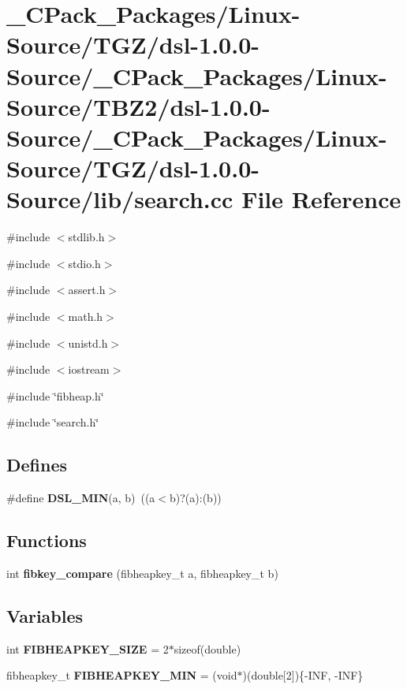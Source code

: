 \section{\_\-CPack\_\-Packages/Linux-\/Source/TGZ/dsl-\/1.0.0-\/Source/\_\-CPack\_\-Packages/Linux-\/Source/TBZ2/dsl-\/1.0.0-\/Source/\_\-CPack\_\-Packages/Linux-\/Source/TGZ/dsl-\/1.0.0-\/Source/lib/search.cc File Reference}
\label{__CPack__Packages_2Linux-Source_2TGZ_2dsl-1_80_80-Source_2__CPack__Packages_2Linux-Source_2TBZ2_3883198a2c058c7cc624e08b98887636}
{\ttfamily \#include $<$stdlib.h$>$}\par
{\ttfamily \#include $<$stdio.h$>$}\par
{\ttfamily \#include $<$assert.h$>$}\par
{\ttfamily \#include $<$math.h$>$}\par
{\ttfamily \#include $<$unistd.h$>$}\par
{\ttfamily \#include $<$iostream$>$}\par
{\ttfamily \#include \char`\"{}fibheap.h\char`\"{}}\par
{\ttfamily \#include \char`\"{}search.h\char`\"{}}\par
\subsection*{Defines}
\begin{DoxyCompactItemize}
\item 
\#define {\bf DSL\_\-MIN}(a, b)~((a$<$b)?(a):(b))
\end{DoxyCompactItemize}
\subsection*{Functions}
\begin{DoxyCompactItemize}
\item 
int {\bf fibkey\_\-compare} (fibheapkey\_\-t a, fibheapkey\_\-t b)
\end{DoxyCompactItemize}
\subsection*{Variables}
\begin{DoxyCompactItemize}
\item 
int {\bf FIBHEAPKEY\_\-SIZE} = 2$\ast$sizeof(double)
\item 
fibheapkey\_\-t {\bf FIBHEAPKEY\_\-MIN} = (void$\ast$)(double[2])\{-\/INF, -\/INF\}
\end{DoxyCompactItemize}


